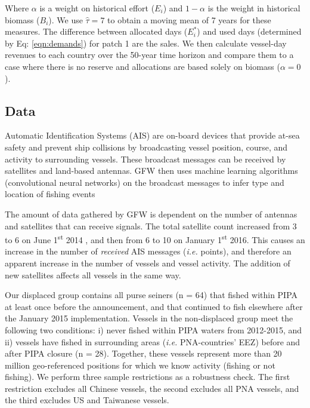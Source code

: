 \documentclass[12pt]{article}
\begin{document}
Where  $\alpha$ is a weight on historical effort ($E_i$) and $1-\alpha$ is the weight in historical biomass ($B_i$). We use $\hat{\tau}= 7$ to obtain a moving mean of 7 years for these measures. The difference between allocated days ($E_i^*$) and used days (determined by Eq: \ref{eqn:demands}) for patch 1 are the sales. We then calculate vessel-day revenues to each country over the 50-year time horizon and compare them to a case where there is no reserve and allocations are based solely on biomass ($\alpha = 0$).

\subsection{Data}

Automatic Identification Systems (AIS) are on-board devices that provide at-sea safety and prevent ship collisions by broadcasting vessel position, course, and activity to surrounding vessels. These broadcast messages can be received by satellites and land-based antennas. GFW then uses machine learning algorithms (convolutional neural networks) on the broadcast messages to infer type and location of fishing events \cite{kroodsma_2018}

The amount of data gathered by GFW is dependent on the number of antennas and satellites that can receive signals. The total satellite count increased from 3 to 6 on June 1\textsuperscript{st} 2014 , and then from 6 to 10 on January 1\textsuperscript{st} 2016. This causes an increase in the number of \emph{received} AIS messages (\emph{i.e.} points), and therefore an apparent increase in the number of vessels and vessel activity. The addition of new satellites affects all vessels in the same way.

Our displaced group contains all purse seiners (n = 64) that fished within PIPA at least once before the announcement, and that continued to fish elsewhere after the January 2015 implementation. Vessels in the non-displaced group meet the following two conditions: i) never fished within PIPA waters from 2012-2015, and ii) vessels have fished in surrounding areas (\emph{i.e.} PNA-countries' EEZ) before and after PIPA closure (n = 28). Together, these vessels represent more than 20 million geo-referenced positions for which we know activity (fishing or not fishing). We perform three sample restrictions as a robustness check. The first restriction excludes all Chinese vessels, the second excludes all PNA vessels, and the third excludes US and Taiwanese vessels.
\end{document}
